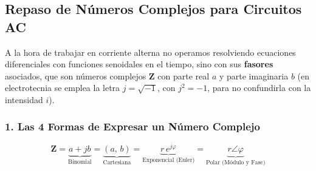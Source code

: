 \subsection{Repaso de Números Complejos para Circuitos AC}

A la hora de trabajar en corriente alterna no operamos resolviendo ecuaciones diferenciales con funciones senoidales en el tiempo, sino con sus \textbf{fasores} asociados, que son números complejos $\mathbf{Z}$ con parte real $a$ y parte imaginaria $b$ (en electrotecnia se emplea la letra $j = \sqrt{-1}$, con $j^2 = -1$, para no confundirla con la intensidad $i$).

\subsubsection{1. Las 4 Formas de Expresar un Número Complejo}
\begin{equation}
    \mathbf{Z} = \underbrace{a + j b}_{\text{Binomial}} = \underbrace{(a,\,b)}_{\text{Cartesiana}} = \underbrace{r\,e^{j\varphi}}_{\text{Exponencial (Euler)}} = \underbrace{r\angle\varphi}_{\text{Polar (Módulo y Fase)}}
\end{equation}

